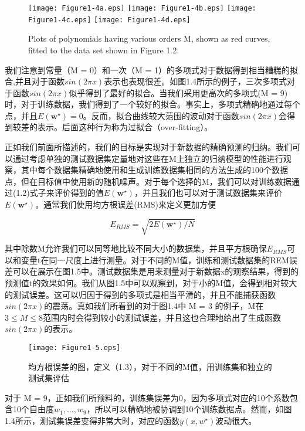 \begin{figure}[t]
	
	\texttt{[image: Figure1-4a.eps]}
	\texttt{[image: Figure1-4b.eps]}
	\texttt{[image: Figure1-4c.eps]}
	\texttt{[image: Figure1-4d.eps]}
	\caption{Plots of polynomials having various orders M, shown as red curves, fitted to the data set shown in
		Figure 1.2. } 
\end{figure}

	我们注意到常量（M = 0）和一次（M = 1）的多项式对于数据得到相当糟糕的拟合,并且对于函数$sin(2 \pi x)$表示也表现很差。如图1.4所示的例子，三次多项式对于函数$sin(2 \pi x)$似乎得到了最好的拟合。当我们采用更高次的多项式(M = 9)时，对于训练数据，我们得到了一个较好的拟合。事实上，多项式精确地通过每个点，并且$E(\mathbf{w}^{\star}) = 0$。反而，拟合曲线较大范围的波动对于函数$sin(2 \pi x)$会得到较差的表示。后面这种行为称为过拟合（over-fitting）。
	
	正如我们前面所描述的，我们的目标是实现对于新数据的精确预测的归纳。我们可以通过考虑单独的测试数据集定量地对这些在M上独立的归纳模型的性能进行观察，其中每个数据集精确地使用和生成训练数据集相同的方法生成的100个数据点，但在目标值中使用新的随机噪声。对于每个选择的M，我们可以对训练数据通过(1.2)式子来评价得到的值$E(\mathbf{w}^{\star})$，并且我们也可以对于测试数据集来评价$E(\mathbf{w}^{\star})$。通常我们使用均方根误差(RMS)来定义更加方便
	
	\begin{equation}
	E_{RMS} = \sqrt{2E(\mathbf{w}^{\star})/N}
	\end{equation}
	
	其中除数M允许我们可以同等地比较不同大小的数据集，并且平方根确保$E_{RMS}$可以和变量t在同一尺度上进行测量。对于不同的M值，训练和测试数据集的REM误差可以在展示在图1.5中。测试数据集是用来测量对于新数据x的观察结果，得到的预测值t的效果如何。我们从图1.5中可以观察到，对于小的M值，会得到相对较大的测试误差。这可以归因于得到的多项式是相当平滑的，并且不能捕获函数$sin(2 \pi x)$的震荡。真如我们所看到的对于图1.4中 M = 3 的例子，M在$3 \leq M \leq 8$范围内时会得到较小的测试误差，并且这也合理地给出了生成函数$sin(2 \pi x)$的表示。

\begin{figure}
	\parbox{.4\textwidth}{\caption{均方根误差的图，定义（1.3），对于不同的M值，用训练集和独立的测试集评估}}
	\parbox{.5\textwidth}{\texttt{[image: Figure1-5.eps]}}
	\label{fig:endb-flow} 
\end{figure}

	对于 M = 9，正如我们所预料的，训练集误差为0，因为多项式对应的10个系数包含10个自由度$w_1,\dots,w_9$，所以可以精确地被协调到10个训练数据点。然而，如图1.4所示，测试集误差变得非常大时，对应的函数$y(x, w^{\star})$波动很大。
	
